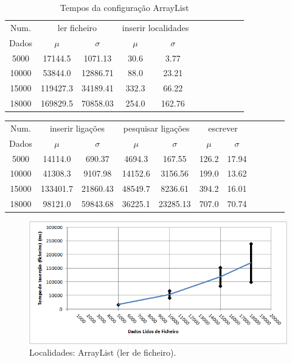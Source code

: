 \documentclass[a5paper,twocolumn, 11pt]{article}
\begin{document}
\clearpage
\onecolumn
\begin{center}
    \begin{table}[h!b!t!]
    \begin{center}
    \caption{Tempos da configuração ArrayList}
    \begin{tabular}[hbt]{ | *{11}{c|} }
    \hline
        Num. & \multicolumn{2}{|c|}{ler ficheiro} & \multicolumn{2}{|c|}{inserir localidades}\\ %
        Dados & $\mu$ & $\sigma$ & $\mu$ & $\sigma$\\ \hline
        5000 & 17144.5 & 1071.13 & 30.6 & 3.77\\ \hline
        10000 & 53844.0 & 12886.71 & 88.0 & 23.21\\ \hline
        15000 & 119427.3 & 34189.41 & 332.3 & 66.22\\ \hline
        18000 & 169829.5 & 70858.03 & 254.0 & 162.76\\ \hline
    \end{tabular}
\end{center}
\end{table}
    \begin{tabular}{ | *{11}{c|} }
    \hline
        Num.  & \multicolumn{2}{|c|}{inserir ligações} & \multicolumn{2}{|c|}{pesquisar ligações} & \multicolumn{2}{|c|}{escrever}\\ %
        Dados & $\mu$ & $\sigma$ & $\mu$ & $\sigma$ & $\mu$ & $\sigma$\\ \hline

        5000 & 14114.0 & 690.37 & 4694.3 & 167.55 & 126.2 & 17.94\\ \hline
        10000 & 41308.3 & 9107.98 & 14152.6 & 3156.56 & 199.0 & 13.62\\ \hline
        15000 & 133401.7 & 21860.43 & 48549.7 & 8236.61 & 394.2 & 16.01\\ \hline
        18000 & 98121.0 & 59843.68 & 36225.1 & 23285.13 & 707.0 & 70.74\\ \hline
    \end{tabular}
\end{center}
\begin{figure}[h!b!t!]
    \caption[Localidades: ArrayList (ler de ficheiro)]{Localidades: ArrayList (ler de ficheiro).}
    \label{hashtable}
    \centering
        \includegraphics[width=400pt]{cloc_conf1_o1.png}
\end{figure}
\end{document}
